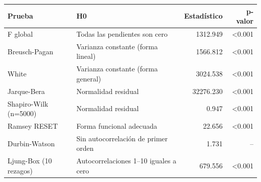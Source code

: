 \begin{tabular}{llrr}
\toprule
Prueba & H0 & Estadístico & p-valor \\
\midrule
F global & Todas las pendientes son cero & 1312.949 & <0.001 \\
Breusch-Pagan & Varianza constante (forma lineal) & 1566.812 & <0.001 \\
White & Varianza constante (forma general) & 3024.538 & <0.001 \\
Jarque-Bera & Normalidad residual & 32276.230 & <0.001 \\
Shapiro-Wilk (n=5000) & Normalidad residual & 0.947 & <0.001 \\
Ramsey RESET & Forma funcional adecuada & 22.656 & <0.001 \\
Durbin-Watson & Sin autocorrelación de primer orden & 1.731 & -- \\
Ljung-Box (10 rezagos) & Autocorrelaciones 1--10 iguales a cero & 679.556 & <0.001 \\
\bottomrule
\end{tabular}
